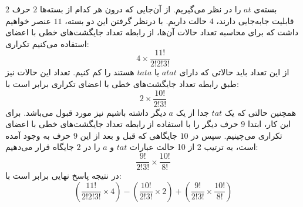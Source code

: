 \p 
$2$ 
بسته‌ی
$at$
را در نظر می‌گیریم. از آن‌جایی که درون هر کدام از بسته‌ها
$2$  
حرف قابلیت جابه‌جایی دارند،
$4$ حالت
داریم. با درنظر گرفتن این دو بسته،
$11$ 
  عنصر خواهیم داشت که برای محاسبه تعداد حالات آن‌ها، از رابطه تعداد جایگشت‌های خطی با اعضای تکراری‎ استفاده می‌کنیم:
$$ 4 \times \frac{11!}{2!2!3!}$$ 
\p
  از این تعداد باید حالاتی که دارای
$atat$
   یا 
$tata$
   هستند را کم کنیم. تعداد این حالات نیز طبق رابطه تعداد جایگشت‌های خطی با اعضای تکراری برابر است با:
$$2 \times \frac{10!}{2!3!}$$
\p
  همچنین حالتی که یک
$tat$
     جدا از یک 
$a$
      دیگر داشته باشیم نیز مورد قبول می‌باشد.
      برای این کار، 
      ابتدا 
      $9$ 
             حرف دیگر را با استفاده از رابطه تعداد جایگشت‌های خطی با اعضای تکراری می‌چینیم. سپس در 
      $10$ 
            جایگاهی که قبل و بعد از این 
      $9$ 
            حرف به وجود آمده است،
            به ترتیب 2 از 10 حالت عبارات
      $tat$
            و
      $a$ 
      را در
      $2$ 
      جایگاه‌ قرار می‌دهیم:
      $$\frac{9!}{2!3!} \times \frac{10!}{8!}$$
	\p
     در نتیجه پاسخ نهایی برابر است با:
    \[(\frac{11!}{2!2!3!}\times4) - (\frac{10!}{2!3!}\times2 )+ ({\frac{9!}{2!3!}}\times \frac{10!}{8!})\]